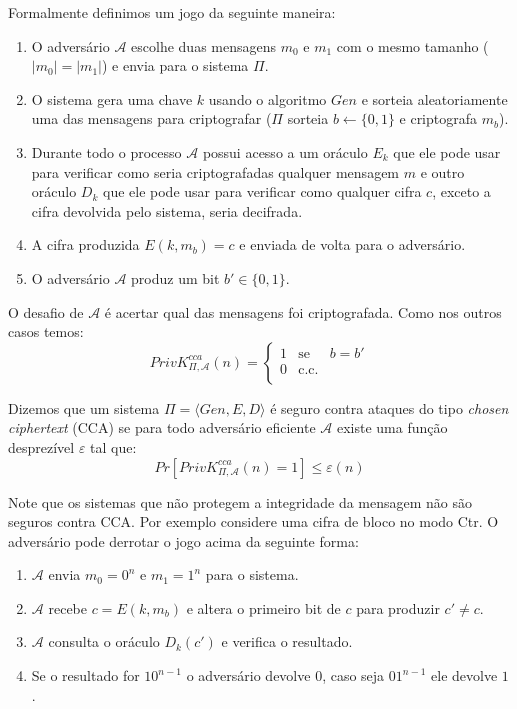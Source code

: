 Formalmente definimos um jogo da seguinte maneira:
\begin{enumerate}
\item O adversário $\mathcal{A}$ escolhe duas mensagens $m_0$ e $m_1$ com o mesmo tamanho ($|m_0| = |m_1|$) e envia para o sistema $\Pi$.
\item O sistema gera uma chave $k$ usando o algoritmo $Gen$ e sorteia aleatoriamente uma das mensagens para criptografar ($\Pi$ sorteia $b \leftarrow \{0, 1\}$ e criptografa $m_b$).
\item Durante todo o processo $\mathcal{A}$ possui acesso a um oráculo $E_k$ que ele pode usar para verificar como seria criptografadas qualquer mensagem $m$ e outro oráculo $D_k$ que ele pode usar para verificar como qualquer cifra $c$, exceto a cifra devolvida pelo sistema, seria decifrada.
\item A cifra produzida $E(k, m_b) = c$ e enviada de volta para o adversário.
\item O adversário $\mathcal{A}$ produz um bit $b' \in \{0,1\}$.
\end{enumerate}

O desafio de $\mathcal{A}$ é acertar qual das mensagens foi criptografada.
Como nos outros casos temos:
\begin{displaymath}
  PrivK^{cca}_{\Pi, \mathcal{A}}(n) = \left\{
    \begin{array}{lcl}
      1 & \textrm{se} & b = b'\\
      0 & \textrm{c.c.} &\\
    \end{array}
    \right.
\end{displaymath}

Dizemos que um sistema $\Pi = \langle Gen, E, D \rangle$ é seguro contra ataques do tipo {\em chosen ciphertext} (CCA) se para todo adversário eficiente $\mathcal{A}$ existe uma função desprezível $\varepsilon$ tal que:
\begin{displaymath}
  Pr[PrivK^{cca}_{\Pi, \mathcal{A}}(n) = 1] \leq \varepsilon(n)
\end{displaymath}

Note que os sistemas que não protegem a integridade da mensagem não são seguros contra CCA.
Por exemplo considere uma cifra de bloco no modo Ctr.
O adversário pode derrotar o jogo acima da seguinte forma:
\begin{enumerate}
\item $\mathcal{A}$ envia $m_0 = 0^n$ e $m_1 = 1^n$ para o sistema.
\item $\mathcal{A}$ recebe $c = E(k, m_b)$ e altera o primeiro bit de $c$ para produzir $c' \neq c$.
\item $\mathcal{A}$ consulta o oráculo $D_k(c')$ e verifica o resultado.
\item Se o resultado for $10^{n-1}$ o adversário devolve $0$, caso seja $01^{n-1}$ ele devolve $1$.
\end{enumerate}

